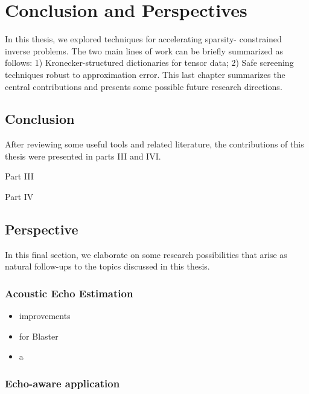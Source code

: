 \chapter{Conclusion and Perspectives}\label{ch:conclusion}

In this thesis, we explored techniques for accelerating sparsity- constrained inverse problems.
The two main lines of work can be briefly summarized as follows:
1) Kronecker-structured dictionaries for tensor data;
2) Safe screening techniques robust to approximation error.
This last chapter summarizes the central contributions and presents some possible future research directions.


\section{Conclusion}

After reviewing some useful tools and related literature, the contributions of this thesis were presented in parts III and IVI.


Part III


Part IV

\section{Perspective}
In this final section, we elaborate on some research possibilities that arise as natural follow-ups to the topics discussed in this thesis.

\subsection{Acoustic Echo Estimation}

\begin{itemize}
    \item improvements
    \item for Blaster
\end{itemize}


\begin{itemize}
    \item a
\end{itemize}


\subsection{Echo-aware application}

